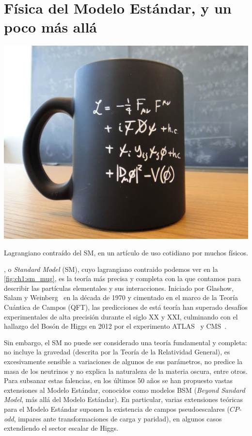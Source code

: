 \chapter{Física del Modelo Estándar, y un poco más allá} \label{chap:ch1}

\begin{marginfigure}[27em]
    \includegraphics[width=0.99\linewidth]{Assets/Images/sm_mug.jpg}
    \caption{Lagrangiano contraído del SM, en un artículo de uso cotidiano por muchos físicos.}
    \label{fig:ch1:sm_mug}
\end{marginfigure}

, o \textit{Standard Model} (SM), cuyo lagrangiano contraido podemos ver en la \cref{fig:ch1:sm_mug}, es la teoría más precisa y completa con la que contamos para describir las partículas elementales y sus interacciones. Iniciado por Glashow, Salam y Weinberg~\cite{Glashow1961,Weinberg1967,Salam1959} en la década de 1970 y cimentado en el marco de la Teoría Cuántica de Campos (QFT), las predicciones de está teoría han superado desafíos experimentales de alta precisión durante el siglo XX y XXI, culminando con el hallazgo del Bosón de Higgs en 2012 por el experimento ATLAS~\cite{TheATLASCollaboration2012} y CMS~\cite{TheCMSCollaboration2012}.

Sin embargo, el SM no puede ser considerado una teoría fundamental y completa: no incluye la gravedad (descrita por la Teoría de la Relatividad General), es excesivamente sensible a variaciones de algunos de sus parámetros, no predice la masa de los neutrinos y no explica la naturaleza de la materia oscura, entre otros. Para subsanar estas falencias, en los últimos 50 años se han propuesto vastas extensiones al Modelo Estándar, conocidos como modelos BSM (\textit{Beyond Sandard Model}, más allá del Modelo Estándar). En particular, varias extensiones teóricas para el Modelo Estándar suponen la existencia de campos pseudoescalares (\textit{$CP$-odd}, impares ante transformaciones de carga y paridad), en algunos casos extendiendo el sector escalar de Higgs.

